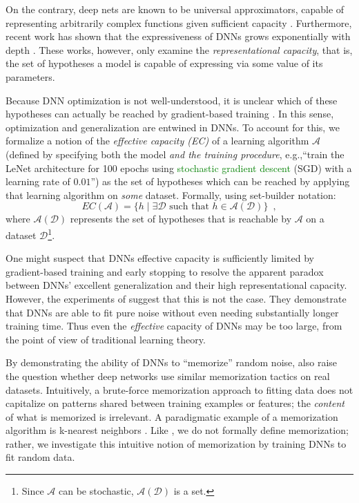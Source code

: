 \documentclass{article}
\newcommand{\af}[1]{\textcolor{green}{#1}}
\newcommand{\af}[1]{\textcolor{black}{#1}}
\begin{document}
On the contrary, deep nets are known to be universal approximators, capable of representing arbitrarily complex functions given sufficient capacity \cite{cybenko1989approximation, hornik1989multilayer}.  
Furthermore, recent work has shown that the expressiveness of DNNs grows exponentially with depth \cite{montufar2014,ganguli2016}.
These works, however, only examine the \textit{representational capacity}, that is, the set of hypotheses a model is capable of expressing via some value of its parameters.

Because DNN optimization is not well-understood, it is unclear which of these hypotheses can actually be reached by gradient-based training \cite{bottou1998online}.
In this sense, optimization and generalization are entwined in DNNs.
To account for this, we formalize a notion of the \textit{effective capacity (EC)} of a learning algorithm $\mathcal{A}$ (defined by specifying both the model {\it and the training procedure}, e.g.,``train the LeNet architecture \citep{lecun1998mnist} for 100 epochs using \af{stochastic gradient descent} (SGD) with a learning rate of $0.01$'') as the set of hypotheses which can be reached by applying that learning algorithm on {\it some} dataset.  Formally, using set-builder notation:
$$
EC(\mathcal{A}) = \{h \mid  \exists \mathcal{D} \text{ such that } h \in \mathcal{A}(\mathcal{D}) \} \enspace,
$$
where $\mathcal{A}(\mathcal{D})$
represents the set of hypotheses that is reachable by $\mathcal{A}$ on a dataset $\mathcal{D}$\footnote{
Since $\mathcal{A}$ can be stochastic, $\mathcal{A}(\mathcal{D})$ is a set.
}.

One might suspect that DNNs effective capacity is sufficiently limited by gradient-based training and early stopping to resolve the apparent paradox between DNNs' excellent generalization and their high representational capacity.
However, the experiments of \citet{understanding_DL} suggest that this is not the case.
They demonstrate that DNNs are able to fit pure noise without even needing substantially longer training time. 
Thus even the {\it effective} capacity of DNNs may be too large, from the point of view of traditional learning theory.

By demonstrating the ability of DNNs to ``memorize'' random noise, \citet{understanding_DL} also raise the question whether deep networks use similar memorization tactics on real datasets.
Intuitively, a brute-force memorization approach to fitting data does not capitalize on patterns shared between training examples or features; the \emph{content} of what is memorized is irrelevant.
A paradigmatic example of a memorization algorithm is k-nearest neighbors \citep{fix1951discriminatory}.
Like \citet{understanding_DL}, we do not formally define memorization; rather, we investigate this intuitive notion of memorization by training DNNs to fit random data.
\end{document}
